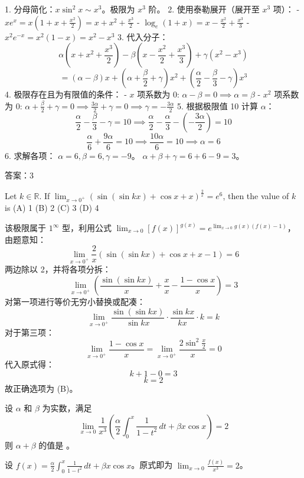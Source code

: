 \begin{questions}
\begin{solution}
1. 分母简化：$x \sin^2 x \sim x^3$。极限为 $x^3$ 阶。
2. 使用泰勒展开（展开至 $x^3$ 项）：
   - $xe^x = x(1 + x + \frac{x^2}{2}) = x + x^2 + \frac{x^3}{2}$
   - $\log_e(1+x) = x - \frac{x^2}{2} + \frac{x^3}{3}$
   - $x^2 e^{-x} = x^2(1 - x) = x^2 - x^3$
3. 代入分子：
   \[ \alpha(x + x^2 + \frac{x^3}{2}) - \beta(x - \frac{x^2}{2} + \frac{x^3}{3}) + \gamma(x^2 - x^3) \]
   \[ = (\alpha - \beta)x + (\alpha + \frac{\beta}{2} + \gamma)x^2 + (\frac{\alpha}{2} - \frac{\beta}{3} - \gamma)x^3 \]
4. 极限存在且为有限值的条件：
   - $x$ 项系数为 0: $\alpha - \beta = 0 \implies \alpha = \beta$
   - $x^2$ 项系数为 0: $\alpha + \frac{\beta}{2} + \gamma = 0 \implies \frac{3\alpha}{2} + \gamma = 0 \implies \gamma = -\frac{3\alpha}{2}$
5. 根据极限值 10 计算 $\alpha$：
   \[ \frac{\alpha}{2} - \frac{\beta}{3} - \gamma = 10 \implies \frac{\alpha}{2} - \frac{\alpha}{3} - (-\frac{3\alpha}{2}) = 10 \]
   \[ \frac{\alpha}{6} + \frac{9\alpha}{6} = 10 \implies \frac{10\alpha}{6} = 10 \implies \alpha = 6 \]
6. 求解各项：
   $\alpha = 6, \beta = 6, \gamma = -9$。
   $\alpha + \beta + \gamma = 6 + 6 - 9 = 3$。

答案：3
\end{solution}
    \question Let $k \in \mathbb{R}$. If $\lim_{x \to 0^+} \left( \sin(\sin kx) + \cos x + x \right)^{\frac{2}{x}} = e^6$, then the value of $k$ is
(A) 1 \qquad (B) 2 \qquad (C) 3 \qquad (D) 4

\begin{solution}
该极限属于 $1^\infty$ 型，利用公式 $\lim_{x \to 0} [f(x)]^{g(x)} = e^{\lim_{x \to 0} g(x)(f(x)-1)}$，由题意知：
\[
\lim_{x \to 0^+} \frac{2}{x} (\sin(\sin kx) + \cos x + x - 1) = 6
\]
两边除以 2，并将各项分拆：
\[
\lim_{x \to 0^+} \left( \frac{\sin(\sin kx)}{x} + \frac{x}{x} - \frac{1 - \cos x}{x} \right) = 3
\]
对第一项进行等价无穷小替换或配凑：
\[
\lim_{x \to 0^+} \frac{\sin(\sin kx)}{\sin kx} \cdot \frac{\sin kx}{kx} \cdot k = k
\]
对于第三项：
\[
\lim_{x \to 0^+} \frac{1 - \cos x}{x} = \lim_{x \to 0^+} \frac{2 \sin^2 \frac{x}{2}}{x} = 0
\]
代入原式得：
\[
k + 1 - 0 = 3
\]
\[
k = 2
\]
故正确选项为 (B)。
\end{solution}

    \question
设 $\alpha$ 和 $\beta$ 为实数，满足
\[
\lim_{x \to 0} \frac{1}{x^3} \left( \frac{\alpha}{2} \int_{0}^{x} \frac{1}{1-t^2} \,dt + \beta x \cos x \right) = 2
\]
则 $\alpha + \beta$ 的值是 \underline{\hspace{2cm}}。

\begin{solution}
    设 $f(x) = \frac{\alpha}{2} \int_{0}^{x} \frac{1}{1-t^2} \,dt + \beta x \cos x$。原式即为 $\lim_{x \to 0} \frac{f(x)}{x^3} = 2$。
    

\end{solution}
\end{questions}
